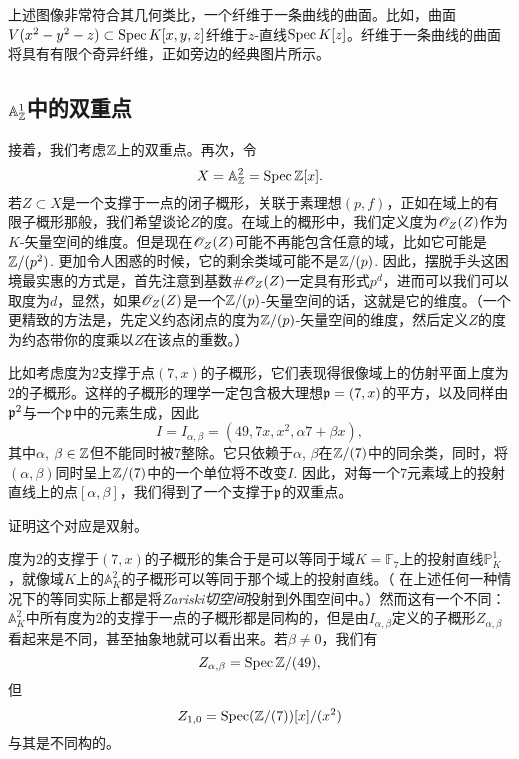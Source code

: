 
上述图像非常符合其几何类比，一个纤维于一条曲线的曲面。比如，曲面$V(x^2-y^2-z)\subset \operatorname{Spec} K[x,y,z]$纤维于$z$-直线$\operatorname{Spec} K[z]$。纤维于一条曲线的曲面将具有有限个奇异纤维，正如旁边的经典图片所示。

\subsection{$\mathbb{A}_{\mathbb{Z}}^1$中的双重点}

接着，我们考虑$\mathbb{Z}$上的双重点。再次，令
\[
	X=\mathbb{A}_{\mathbb{Z}}^2=\operatorname{Spec}\mathbb{Z}[x].
\]
若$Z\subset X$是一个支撑于一点的闭子概形，关联于素理想$(p,f)$，正如在域上的有限子概形那般，我们希望谈论$Z$的度。在域上的概形中，我们定义度为$\mathscr{O}_Z(Z)$作为$K$-矢量空间的维度。但是现在$\mathscr{O}_Z(Z)$可能不再能包含任意的域，比如它可能是$\mathbb{Z}/(p^2)$. 更加令人困惑的时候，它的剩余类域可能不是$\mathbb{Z}/(p)$. 因此，摆脱手头这困境最实惠的方式是，首先注意到基数$\# \mathscr{O}_Z(Z)$一定具有形式$p^d$，进而可以我们可以取度为$d$，显然，如果$\mathscr{O}_Z(Z)$是一个$\mathbb{Z}/(p)$-矢量空间的话，这就是它的维度。（一个更精致的方法是，先定义约态闭点的度为$\mathbb{Z}/(p)$-矢量空间的维度，然后定义$Z$的度为约态带你的度乘以$Z$在该点的重数。）

比如考虑度为$2$支撑于点$(7,x)$的子概形，它们表现得很像域上的仿射平面上度为$2$的子概形。这样的子概形的理学一定包含极大理想$\mathfrak{p}=(7,x)$的平方，以及同样由$\mathfrak{p}^2$与一个$\mathfrak{p}$中的元素生成，因此
\[
	I=I_{\alpha,\beta}=(49,7x,x^2,\alpha 7+\beta x),
\]
其中$\alpha$, $\beta\in\mathbb{Z}$但不能同时被$7$整除。它只依赖于$\alpha$, $\beta$在$\mathbb{Z}/(7)$中的同余类，同时，将$(\alpha,\beta)$同时呈上$\mathbb{Z}/(7)$中的一个单位将不改变$I$. 因此，对每一个$7$元素域上的投射直线上的点$[\alpha,\beta]$，我们得到了一个支撑于$\mathfrak{p}$的双重点。

\begin{exe}
证明这个对应是双射。
\end{exe}

度为$2$的支撑于$(7,x)$的子概形的集合于是可以等同于域$K=\mathbb{F}_7$上的投射直线$\mathbb{P}_K^1$，就像域$K$上的$\mathbb{A}_K^2$的子概形可以等同于那个域上的投射直线。（
在上述任何一种情况下的等同实际上都是将\textit{Zariski切空间}投射到外围空间中。\nottran）然而这有一个不同：$\mathbb{A}_K^2$中所有度为2的支撑于一点的子概形都是同构的，但是由$I_{\alpha,\beta}$定义的子概形$Z_{\alpha,\beta}$看起来是不同，甚至抽象地就可以看出来。若$\beta\neq 0$，我们有
\[
	Z_{\alpha,\beta}=\operatorname{Spec} \mathbb{Z}/(49),
\]
但
\[
	Z_{1,0}=\operatorname{Spec}(\mathbb{Z}/(7))[x]/(x^2)
\]
与其是不同构的。

